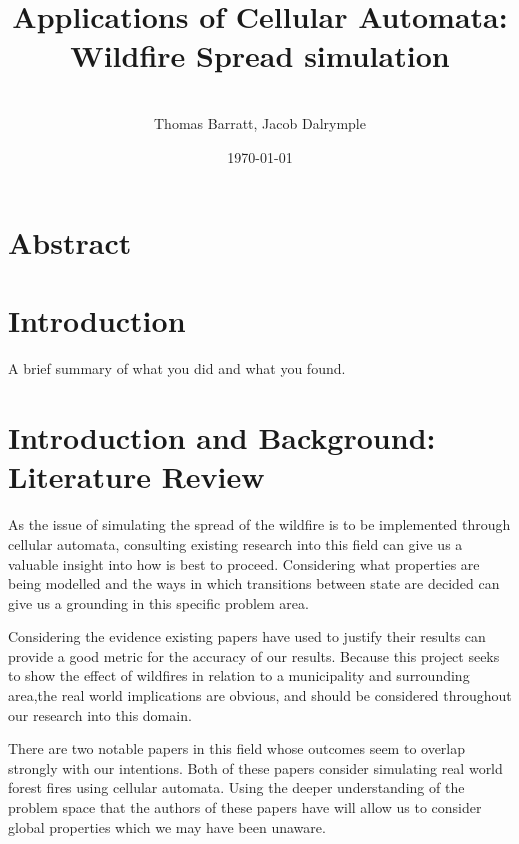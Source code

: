 \documentclass[11pt, a4paper, titlepage]{article}
\date{}
\title{ \textbf{Applications of Cellular Automata: Wildfire Spread simulation} \\  }
\author{\\ \Large{Thomas Barratt, Jacob Dalrymple  } }
\date{\today}
\begin{document}
\maketitle

\newpage

\section{Abstract}

\section{Introduction}

\begin{displayquote}
  A brief summary of what you did and what you found.
\end{displayquote}

\section{Introduction and Background: Literature Review}
As the issue of simulating the spread of the wildfire is to be implemented through cellular automata, consulting existing research into this field can give us a valuable insight into how is best to proceed. Considering what properties are being modelled and the ways in which transitions between state are decided can give us a grounding in this specific problem area.


Considering the evidence existing papers have used to justify their results can provide a good metric for the accuracy of our results. Because this project seeks to show the effect of wildfires in relation to a municipality and surrounding area,the real world implications are obvious, and should be considered throughout our research into this domain.


There are two notable papers in this field whose outcomes seem to overlap strongly with our intentions. Both of these papers consider simulating real world forest fires using cellular automata. Using the deeper understanding of the problem space that the authors of these papers have will allow us to consider global properties which we may have been unaware.
\end{document}
